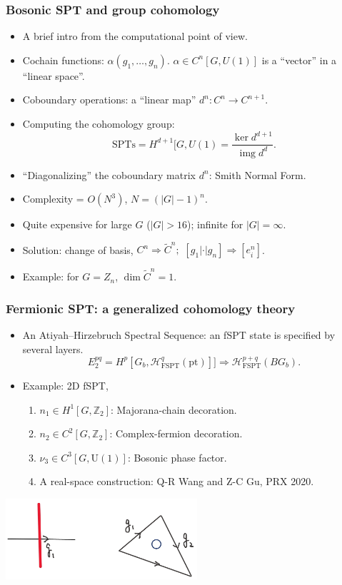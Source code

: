 \documentclass[xcolor=table, 11pt, aspectratio=1610]{beamer}
\newcommand{\uone}{\mathrm U(1)}
\DeclareMathOperator{\img}{img}
\begin{document}
\begin{frame}
  \frametitle{Bosonic SPT and group cohomology}
  \begin{itemize}
  \item A brief intro from the computational point of view.
  \item Cochain functions: $\alpha(g_1,\ldots,g_n)$. $\alpha \in C^n[G, U(1)]$ is a ``vector'' in a ``linear space''.
  \item Coboundary operations: a ``linear map'' $d^n:C^n\rightarrow C^{n+1}$.
  \item Computing the cohomology group:
    \[\text{SPTs} = H^{d+1}[G, U(1) = \frac{\ker d^{d+1}}{\img d^d}.\]
  \item ``Diagonalizing'' the coboundary matrix $d^n$: Smith Normal Form.
  \item Complexity = $O(N^3)$, $N = (|G|-1)^n$.
  \item Quite expensive for large $G$ ($|G| > 16$); infinite for $|G|=\infty$.
  \item Solution: change of basis, $C^n\Rightarrow \tilde C^n;\,\, [g_1|\cdot|g_n]\Rightarrow [e^n_i]$.
  \item Example: for $G=Z_n$, $\dim \tilde C^n=1$.
  \end{itemize}
\end{frame}

\begin{frame}
	\frametitle{Fermionic SPT: a generalized cohomology theory}
	\begin{itemize}
        \item An Atiyah–Hirzebruch Spectral Sequence: an fSPT state is specified by several layers.
          \[E^{pq}_2=H^p[G_b, \mathcal{H}_{\text{FSPT}}^q(\text{pt})]]\Rightarrow \mathcal{H}_{\text{FSPT}}^{p+q}(BG_b).\]
        \item Example: 2D fSPT,
          \begin{enumerate}
          \item $n_1\in H^1[G, \mathbb Z_2]$: Majorana-chain decoration.
          \item $n_2\in C^2[G, \mathbb Z_2]$: Complex-fermion decoration.
          \item $\nu_3\in C^3[G, \uone]$: Bosonic phase factor.
          \item A real-space construction: Q-R Wang and Z-C Gu, PRX 2020.
          \end{enumerate}
	\end{itemize}

        \begin{center}
          \includegraphics[height=3cm]{fspt_decor}
        \end{center}
\end{frame}
\end{document}
